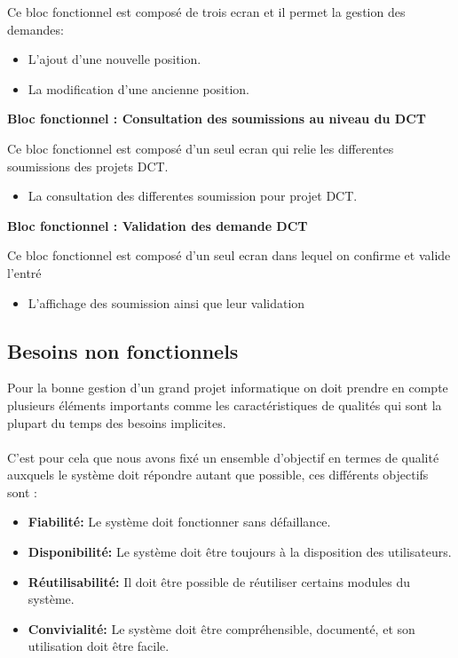 Ce bloc fonctionnel est composé de trois ecran et il permet la gestion des demandes: 
\\
\begin{itemize}
    \item L'ajout d'une nouvelle position.
    \item La modification d'une ancienne position.
\end{itemize}

\vspace{0.5cm}
\textbf{\color{red}Bloc fonctionnel : Consultation des soumissions au niveau du DCT}
    
Ce bloc fonctionnel est composé d'un seul ecran qui relie les differentes soumissions des projets DCT.
\begin{itemize}
    \item La consultation des differentes soumission pour projet DCT.
\end{itemize}

\vspace{0.5cm}
\textbf{\color{red}Bloc fonctionnel : Validation des demande DCT}
    
Ce bloc fonctionnel est composé d'un seul ecran dans lequel on confirme et valide l'entré
\begin{itemize}
    \item L’affichage des soumission ainsi que leur validation
\end{itemize}

\subsection{Besoins non fonctionnels}

Pour la bonne gestion d'un grand projet informatique on doit prendre en compte plusieurs éléments importants comme les caractéristiques de qualités qui sont la plupart du temps des besoins implicites.
\\\\
C'est pour cela que nous avons fixé un ensemble d'objectif en termes de qualité auxquels le système doit répondre autant que possible, ces différents objectifs sont :
\\
\begin{itemize}
    \item \textbf{Fiabilité:} Le système doit fonctionner sans défaillance.
    \item \textbf{Disponibilité:} Le système doit être toujours à la disposition des utilisateurs.
    \item \textbf{Réutilisabilité:} Il doit être possible de réutiliser certains modules du
système.
    \item \textbf{Convivialité:} Le système doit être compréhensible, documenté, et son
utilisation doit être facile.
\end{itemize}
\newpage

